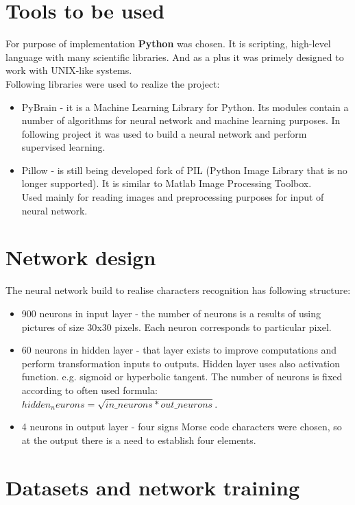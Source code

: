\documentclass[eng,openany]{mgr}
\begin{document}
\section{Tools to be used}
For purpose of implementation \textbf{Python} was chosen. It is scripting, high-level language with many scientific libraries. And as a plus it was primely designed to work with UNIX-like systems.\\
Following libraries were used to realize the project:
\begin{itemize}
\item PyBrain - it is a Machine Learning Library for Python. Its modules contain a number of algorithms for neural network and machine learning purposes. In following project it was used to build a neural network and perform supervised learning.
\item Pillow - is still being developed fork of PIL (Python Image Library that is no longer supported). It is similar to Matlab Image Processing Toolbox.\\
Used mainly for reading images and preprocessing purposes for input of neural network.
\end{itemize}
\section{Network design}
The neural network build to realise characters recognition has following structure:
\begin{itemize}
\item 900 neurons in input layer - the number of neurons is a results of using pictures of size 30x30 pixels. Each neuron corresponds to particular pixel.
\item 60 neurons in hidden layer - that layer exists to improve computations and perform transformation inputs to outputs. Hidden layer uses also activation function. e.g. sigmoid or hyperbolic tangent.
The number of neurons is fixed according to often used formula:\\ $hidden_neurons = \sqrt{in\_neurons * out\_neurons}$.
\item 4 neurons in output layer - four signs Morse code characters were chosen, so at the output there is a need to establish four elements.
\end{itemize}
\newpage
\section{Datasets and network training}
\end{document}
